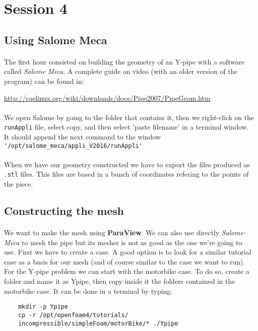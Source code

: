 \lstset{language=C}
\section{Session 4}


\subsection{Using Salome Meca}
\paragraph{}The first hour consisted on building the geometry of an \textsf{Y-pipe} with a software called \emph{Salome Meca}. A complete guide on video (with an older version of the program) can be found in:\\
\begin{center}
\url{http://caelinux.org/wiki/downloads/docs/Pipe2007/PipeGeom.htm}
\end{center}

\paragraph{}We open Salome by going to the folder that contains it, then we right-click on the \texttt{runAppli} file, select copy, and then select 'paste filename' in a terminal window. It should append the next command to the window\\
\lstinline!'/opt/salome_meca/appli_V2016/runAppli'!
\paragraph{}When we have our geometry constructed we have to export the files produced as \texttt{.stl} files. This files are based in a bunch of coordinates refering to the points of the piece. 
\subsection{Constructing the mesh}
\paragraph{}We want to make the mesh using \textbf{ParaView}. We can also use directly \emph{Salome-Meca} to mesh the pipe but its mesher is not as good as the one we're going to use. First we have to create a case. A good option is to look for a similar tutorial case as a basis for our mesh (and of course similar to the case we want to run). For the Y-pipe problem we can start with the motorbike case. To do so, create a folder and name it as Ypipe, then copy inside it the folders contained in the motorbike case. It can be done in a terminal by typing:
\begin{lstlisting}
	mkdir -p Ypipe
	cp -r /opt/openfoam4/tutorials/
	incompressible/simpleFoam/motorBike/* ./Ypipe
\end{lstlisting}

